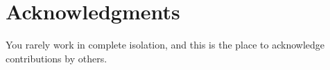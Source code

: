 \chapter*{Acknowledgments}

 {\color{red} You rarely work in complete isolation, and this is the place to acknowledge contributions by others.}
